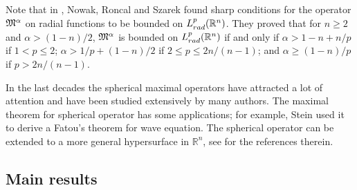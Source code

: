 \documentclass[11pt]{amsproc}
\newcommand{\0}{\mathbf{0}}
\numberwithin{equation}{section}
\numberwithin{figure}{section}
\theoremstyle{definition}
\theoremstyle{remark}
\numberwithin{thm}{section}
\begin{document}
Note that in \cite{NRS},   Nowak, Roncal and Szarek  \cite{NRS} found 
 sharp conditions 
for the    operator ${\frak M}^\alpha$ on radial functions to be bounded on 
 $L^p_{\rm rad}({\mathbb R}^n)$. They
  proved that for $n\geq 2 $ and $ \alpha> (1-n)/2$,    $	{\frak M}^\alpha$  is bounded on $L^p_{\rm rad}({\mathbb R}^n)$ if and only if  
$\alpha> 1-n + n/p$ if $1<p\leq 2$; $\alpha> 1/p + (1-n)/2$ if $2\leq p \leq 2n/(n-1)$; and $\alpha\geq (1-n)/p$ if $p> 2n/(n-1)$.   

\smallskip


In the last decades   the spherical maximal operators
have attracted a lot of attention and have been studied extensively by many authors.
The maximal theorem for spherical operator has some applications; for example, Stein \cite{St2} used it to derive a Fatou's theorem for wave equation.
The spherical operator can be extended to a more general hypersurface in   ${\mathbb R^n}$, see \cite{Bo, G, Io, IS,  MSS, So2,So1,   SS1, SoSt, St1,   SWa} for the references therein.





\smallskip


\subsection{Main results}
\end{document}
